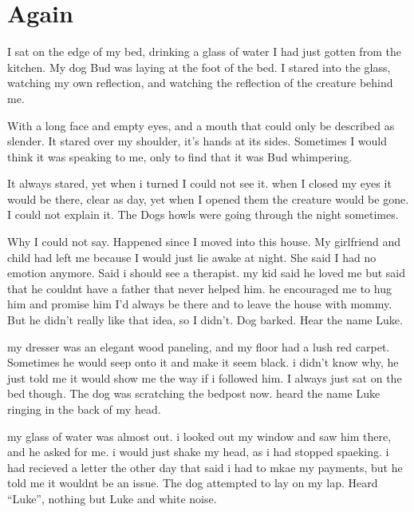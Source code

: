 \chapter{Again}


I sat on the edge of my bed, drinking a glass of water I had just
gotten from the kitchen. My dog Bud was laying at the foot of the
bed. I stared into the glass, watching my own reflection, and
watching the reflection of the creature behind me.



With a long face and empty eyes, and a mouth that could only be
described as slender. It stared over my shoulder, it's hands at its
sides. Sometimes I would think it was speaking to me, only to find
that it was Bud whimpering.



It always stared, yet when i turned I could not see it. when I
closed my eyes it would be there, clear as day, yet when I opened
them the creature would be gone. I could not explain it. The Dogs
howls were going through the night sometimes.



Why I could not say. Happened since I moved into this house. My
girlfriend and child had left me because I would just lie awake at
night. She said I had no emotion anymore. Said i should see a
therapist. my kid said he loved me but said that he couldnt have a
father that never helped him. he encouraged me to hug him and
promise him I'd always be there and to leave the house with mommy.
But he didn't really like that idea, so I didn't. Dog barked. Hear
the name Luke.



my dresser was an elegant wood paneling, and my floor had a lush
red carpet. Sometimes he would seep onto it and make it seem black.
i didn't know why, he just told me it would show me the way if i
followed him. I always just sat on the bed though. The dog was
scratching the bedpost now. heard the name Luke ringing in the back
of my head.



my glass of water was almost out. i looked out my window and saw
him there, and he asked for me. i would just shake my head, as i
had stopped spaeking. i had recieved a letter the other day that
said i had to mkae my payments, but he told me it wouldnt be an
issue. The dog attempted to lay on my lap. Heard ``Luke'', nothing
but Luke and white noise.



